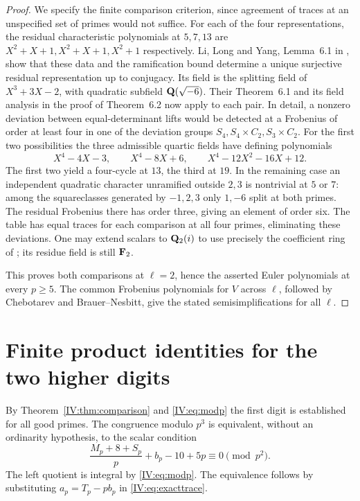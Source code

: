 \documentclass[11pt,letterpaper]{article}
\theoremstyle{definition}
\theoremstyle{remark}
\begin{document}
\begin{proof}
We specify the finite comparison criterion, since agreement of traces
at an unspecified set of primes would not suffice. For each of the
four representations, the residual characteristic polynomials at
$5,7,13$ are $X^2+X+1,X^2+X+1,X^2+1$ respectively.
Li, Long and Yang, Lemma~6.1 in \cite{IV:lly}, show that these data and
the ramification bound determine a unique surjective residual
representation up to conjugacy. Its field is the splitting field
of $X^3+3X-2$, with quadratic subfield $\mathbf Q(\sqrt{-6})$.
Their Theorem~6.1 and its field analysis in the proof of
Theorem~6.2 now apply to each pair. In detail, a nonzero deviation
between equal-determinant lifts would be detected at a Frobenius
of order at least four in one of the deviation groups
$S_4,S_4\times C_2,S_3\times C_2$.
For the first two possibilities the three admissible quartic
fields have defining polynomials
\[
 X^4-4X-3,\qquad X^4-8X+6,\qquad X^4-12X^2-16X+12 .
\]
The first two yield a four-cycle at $13$, the third at $19$.
In the remaining case an independent quadratic character unramified
outside $2,3$ is nontrivial at $5$ or $7$: among the squareclasses
generated by $-1,2,3$ only $1,-6$ split at both primes. The residual
Frobenius there has order three, giving an element of order six.
The table has equal traces for each comparison at all four primes,
eliminating these deviations. One may extend scalars to
$\mathbf Q_2(i)$ to use precisely the coefficient ring of \cite{IV:lly};
its residue field is still $\mathbf F_2$.

This proves both comparisons at $\ell=2$, hence the asserted
Euler polynomials at every $p\geq5$. The common Frobenius
polynomials for $V$ across $\ell$, followed by Chebotarev and
Brauer--Nesbitt, give the stated semisimplifications for all $\ell$.
\end{proof}

\section{Finite product identities for the two higher digits}\label{IV:app:digits}
By Theorem~\ref{IV:thm:comparison} and \eqref{IV:eq:modp} the first digit is established for all
good primes. The congruence modulo $p^3$ is equivalent, without an
ordinarity hypothesis, to the scalar condition
\begin{equation}\label{IV:eq:two}
 \frac{M_p+8+S_p}{p}+b_p-10+5p\equiv0\pmod{p^2}.
\end{equation}
The left quotient is integral by \eqref{IV:eq:modp}. The equivalence
follows by substituting $a_p=T_p-pb_p$ in \eqref{IV:eq:exacttrace}.
\end{document}
